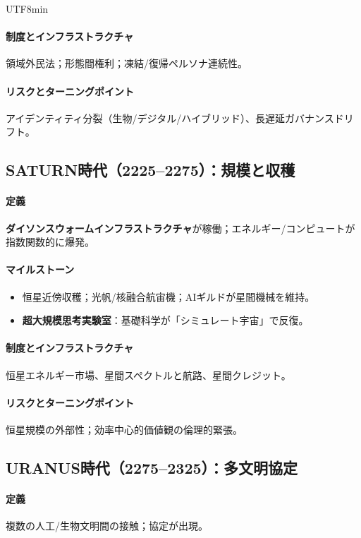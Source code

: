 \documentclass[11pt]{article}
\begin{document}
\begin{CJK}{UTF8}{min}
\begin{itemize}[noitemsep]
\paragraph{制度とインフラストラクチャ} 領域外民法；形態間権利；凍結/復帰ペルソナ連続性。

\paragraph{リスクとターニングポイント} アイデンティティ分裂（生物/デジタル/ハイブリッド）、長遅延ガバナンスドリフト。

\subsection{SATURN時代（2225–2275）：規模と収穫}
\paragraph{定義} \textbf{ダイソンスウォームインフラストラクチャ}が稼働；エネルギー/コンピュートが指数関数的に爆発。

\paragraph{マイルストーン}
\begin{itemize}[noitemsep]
  \item 恒星近傍収穫；光帆/核融合航宙機；AIギルドが星間機械を維持。
  \item \textbf{超大規模思考実験室}：基礎科学が「シミュレート宇宙」で反復。
\end{itemize}

\paragraph{制度とインフラストラクチャ} 恒星エネルギー市場、星間スペクトルと航路、星間クレジット。

\paragraph{リスクとターニングポイント} 恒星規模の外部性；効率中心的価値観の倫理的緊張。

\subsection{URANUS時代（2275–2325）：多文明協定}
\paragraph{定義} 複数の人工/生物文明間の接触；協定が出現。


\end{itemize}
\end{CJK}
\end{document}
